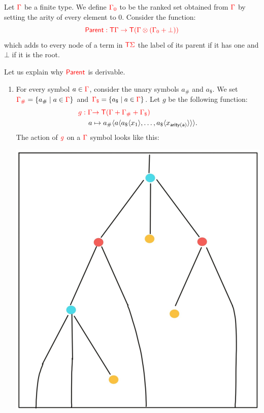 \bigskip
\noindent \begin{example}\label{ex:patternMatching} 
\end{example}


\bigskip
\noindent \begin{example}  Let ${\color{red}{\Gamma}}$ be a finite type. We define ${\color{red}{{\color{red}{\Gamma}}_0}}$  to be the ranked set obtained from ${\color{red}{\Gamma}}$ by setting the arity of every element to $0$.  
\medskip
Consider the function:
$${\color{red}{ \mathsf{Parent}: {\color{red}{\mathsf T}}{\color{red}{\Gamma}}\to {\color{red}{\mathsf T}}({\color{red}{\Gamma}}\otimes ({\color{red}{\Gamma}}_0+\bot))}}$$
which adds to every node of a term in ${\color{red}{\mathsf T}} {\color{red}{\Sigma}}$ the label  of its parent if it has one and $\bot$ if it is the root.

Let us explain why ${\color{red}{\mathsf{Parent}}}$ is derivable. 
\begin{enumerate}
\item For every symbol $a\in {\color{red}{\Gamma}}$, consider the unary symbols $a_\#$ and $a_\$$.
We set ${\color{red}{{\color{red}{\Gamma}}_\#}}=\{a_\#\mid a\in{\color{red}{\Gamma}}\}$ and ${\color{red}{{\color{red}{\Gamma}}_\$}}=\{a_\$\mid a\in{\color{red}{\Gamma}}\}$.
Let $g$ be the following function:
 \begin{align*}
{\color{red}{  g: {\color{red}{\Gamma}}}} &{\color{red}{\to {\color{red}{\mathsf T}}({\color{red}{\Gamma}}+{\color{red}{\Gamma}}_\#+{\color{red}{\Gamma}}_\$)}}\\
  a &\mapsto a_\#\langle{a\langle{a_\$\langle{x_1}\rangle,\dots,a_\$\langle{x_{\mathsf{arity(a)}}}\rangle}\rangle}\rangle.
\end{align*}
The action of ${\color{red}{g}}$ on a ${\color{red}{\Gamma}}$ symbol looks like this:
\begin{center}
\includegraphics[scale=.15]{MyPic1.jpg}

\end{center}
\end{enumerate}
\end{example}

